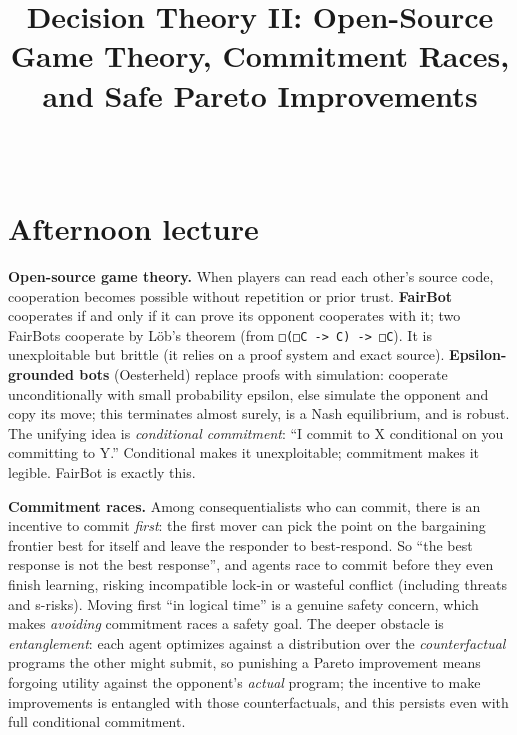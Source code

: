 \documentclass[11pt]{article}
\title{Decision Theory II: Open-Source Game Theory, Commitment Races, and Safe Pareto Improvements}
\author{
  \authorname{Daniel C}
  \and
  \authorname{Satya Benson}\\
  \affiliation{Williams College}
}
\begin{document}
\maketitle


\section{Afternoon lecture}
\textbf{Open-source game theory.} When players can read each other's source code, cooperation becomes possible without repetition or prior trust. \textbf{FairBot} cooperates if and only if it can prove its opponent cooperates with it; two FairBots cooperate by Löb's theorem (from \texttt{□(□C\ -\textgreater{}\ C)\ -\textgreater{}\ □C}). It is unexploitable but brittle (it relies on a proof system and exact source). \textbf{Epsilon-grounded bots} (Oesterheld) replace proofs with simulation: cooperate unconditionally with small probability epsilon, else simulate the opponent and copy its move; this terminates almost surely, is a Nash equilibrium, and is robust. The unifying idea is \emph{conditional commitment}: ``I commit to X conditional on you committing to Y.'' Conditional makes it unexploitable; commitment makes it legible. FairBot is exactly this.

\textbf{Commitment races.} Among consequentialists who can commit, there is an incentive to commit \emph{first}: the first mover can pick the point on the bargaining frontier best for itself and leave the responder to best-respond. So ``the best response is not the best response'', and agents race to commit before they even finish learning, risking incompatible lock-in or wasteful conflict (including threats and s-risks). Moving first ``in logical time'' is a genuine safety concern, which makes \emph{avoiding} commitment races a safety goal. The deeper obstacle is \emph{entanglement}: each agent optimizes against a distribution over the \emph{counterfactual} programs the other might submit, so punishing a Pareto improvement means forgoing utility against the opponent's \emph{actual} program; the incentive to make improvements is entangled with those counterfactuals, and this persists even with full conditional commitment.
\end{document}

